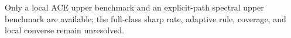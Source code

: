 Only a local ACE upper benchmark and an explicit-path spectral upper benchmark are available; the full-class sharp rate, adaptive rule, coverage, and local converse remain unresolved.